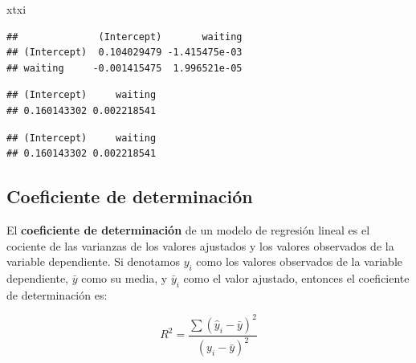 \documentclass[]{article}
\newenvironment{Shaded}{\begin{snugshade}}{\end{snugshade}}
\newcommand{\KeywordTok}[1]{\textcolor[rgb]{0.13,0.29,0.53}{\textbf{{#1}}}}
\newcommand{\DecValTok}[1]{\textcolor[rgb]{0.00,0.00,0.81}{{#1}}}
\newcommand{\StringTok}[1]{\textcolor[rgb]{0.31,0.60,0.02}{{#1}}}
\newcommand{\NormalTok}[1]{{#1}}
\numberwithin{equation}{section}
\begin{document}
\begin{Shaded}
\begin{Highlighting}[]
\NormalTok{xtxi }
\end{Highlighting}
\end{Shaded}

\begin{verbatim}
##              (Intercept)       waiting
## (Intercept)  0.104029479 -1.415475e-03
## waiting     -0.001415475  1.996521e-05
\end{verbatim}

\begin{Shaded}
\end{Shaded}

\begin{verbatim}
## (Intercept)     waiting 
## 0.160143302 0.002218541
\end{verbatim}

\begin{Shaded}
\end{Shaded}

\begin{verbatim}
## (Intercept)     waiting 
## 0.160143302 0.002218541
\end{verbatim}

\subsection{Coeficiente de
determinación}\label{coeficiente-de-determinacion}

El \textbf{coeficiente de determinación} de un modelo de regresión
lineal es el cociente de las varianzas de los valores ajustados y los
valores observados de la variable dependiente. Si denotamos \(y_i\) como
los valores observados de la variable dependiente, \(\bar{y}\) como su
media, y \(\bar{y}_i\) como el valor ajustado, entonces el coeficiente
de determinación es:

\[
    R^2 = \frac{\sum (\hat{y}_i-\bar{y})^2}{(y_i - \bar{y})^2}
\]

\begin{Shaded}
\end{Shaded}
\end{document}
